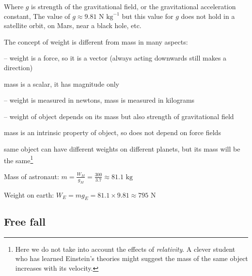Where $g$ is strength of the gravitational field, or the gravitational acceleration constant, The value of $g \approx 9.81 \text{ N kg}^{-1}$ but this value for $g$ does not hold in a satellite orbit, on Mars, near a black hole, etc.


The concept of weight is different from mass in many aspects:
\begin{compactitem}
	\item[--] weight is a force, so it is a vector (always acting downwards still makes a direction)
	
	mass is a scalar, it has magnitude only
	
	\item[--] weight is measured in newtons, mass is measured in kilograms
	
	\item[--] weight of object depends on its mass but also strength of gravitational field
	
	mass is an intrinsic property of object, so does not depend on force fields
	
	same object can have different weights on different planets, but its mass will be the same\footnote{Here we do not take into account the effects of \emph{relativity}. A clever student who has learned Einstein's theories might suggest the mass of the same object increases with its velocity.}
\end{compactitem}


\begin{soln} Mass of astronaut: $m = \frac{W_M}{g_M} = \frac{300}{3.7} \approx 81.1 \text{ kg}$

Weight on earth: $W_E = mg_E = 81.1 \times 9.81 \approx 795 \text{ N}$ \end{soln}

\subsection*{Free fall}

